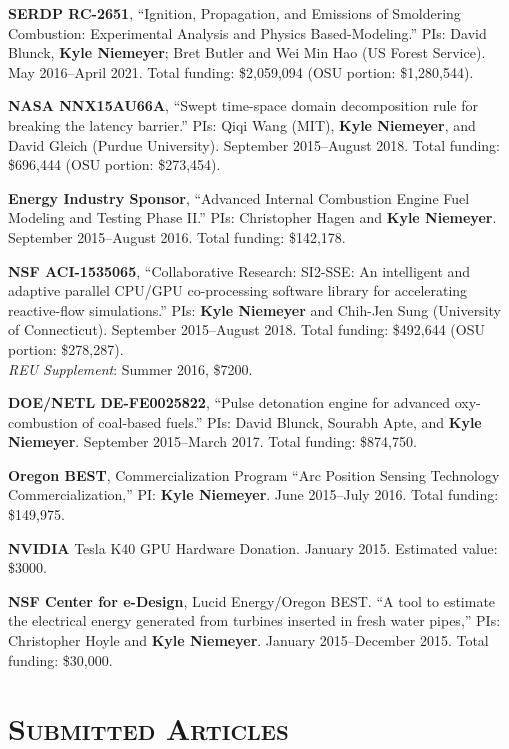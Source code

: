 \documentclass[margin,line,11pt]{res}
\begin{document}
\begin{resume}
\textbf{SERDP RC-2651}, ``Ignition, Propagation, and Emissions of Smoldering Combustion: Experimental Analysis and Physics Based-Modeling.'' PIs: David Blunck, \textbf{Kyle Niemeyer}; Bret Butler and Wei Min Hao (US Forest Service). May 2016--April 2021. Total funding: \$2,059,094 (OSU portion: \$1,280,544).

\textbf{NASA NNX15AU66A}, ``Swept time-space domain decomposition rule for breaking the latency barrier.'' PIs: Qiqi Wang (MIT), \textbf{Kyle Niemeyer}, and David Gleich (Purdue University). September 2015--August 2018. Total funding: \$696,444 (OSU portion: \$273,454).

\textbf{Energy Industry Sponsor}, ``Advanced Internal Combustion Engine Fuel Modeling and Testing Phase II.'' PIs: Christopher Hagen and \textbf{Kyle Niemeyer}. September 2015--August 2016. Total funding: \$142,178.

\textbf{NSF ACI-1535065}, ``Collaborative Research: SI2-SSE: An intelligent and adaptive parallel CPU\slash GPU co-processing software library for accelerating reactive-flow simulations.'' PIs: \textbf{Kyle Niemeyer} and Chih-Jen Sung (University of Connecticut). September 2015--August 2018. Total funding: \$492,644 (OSU portion: \$278,287). \\
\textit{REU Supplement}: Summer 2016, \$7200.

\textbf{DOE\slash NETL DE-FE0025822}, ``Pulse detonation engine for advanced oxy-combustion of coal-based fuels.'' PIs: David Blunck, Sourabh Apte, and \textbf{Kyle Niemeyer}. September 2015--March 2017. Total funding: \$874,750.

\textbf{Oregon BEST}, Commercialization Program ``Arc Position Sensing Technology Commercialization,'' PI: \textbf{Kyle Niemeyer}. June 2015--July 2016. Total funding: \$149,975.

\textbf{NVIDIA} Tesla K40 GPU Hardware Donation. January 2015. Estimated value: \$3000.

\textbf{NSF Center for e-Design}, Lucid Energy\slash Oregon BEST. ``A tool to estimate the electrical energy generated from turbines inserted in fresh water pipes,'' PIs: Christopher Hoyle and \textbf{Kyle Niemeyer}. January 2015--December 2015. Total funding: \$30,000.

\section{\textsc{Submitted Articles}}


\end{resume}
\end{document}

